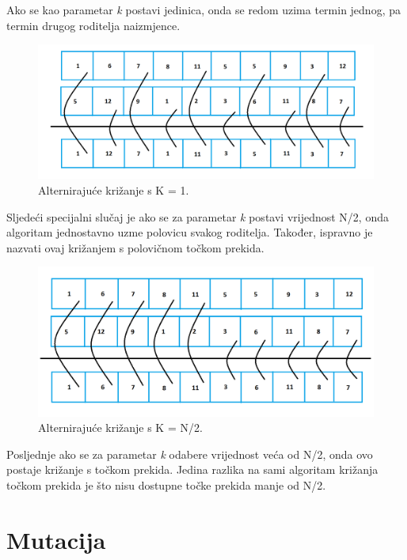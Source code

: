 \documentclass[times, utf8, zavrsni]{fer}
\begin{document}
Ako se kao parametar \emph{k} postavi jedinica, onda se redom uzima termin jednog, pa termin drugog roditelja naizmjence.

\begin{figure}[htb]
\centering
\includegraphics[width=15cm]{images/cross_alt_1.png}
\caption{Alternirajuće križanje s K = 1.}
\label{fig:cross_alt_1}
\end{figure}

Sljedeći specijalni slučaj je ako se za parametar \emph{k} postavi vrijednost N/2, onda algoritam jednostavno uzme polovicu svakog roditelja. Također, ispravno je nazvati ovaj križanjem s polovičnom točkom prekida.

\begin{figure}[htb]
\centering
\includegraphics[width=15cm]{images/half_cross.png}
\caption{Alternirajuće križanje s K = N/2.}
\label{fig:half_cross}
\end{figure}

\newpage

Posljednje ako se za parametar \emph{k} odabere vrijednost veća od N/2, onda ovo postaje križanje s točkom prekida. Jedina razlika na sami algoritam križanja točkom prekida je što nisu dostupne točke prekida manje od N/2.

\section{Mutacija}
\end{document}
